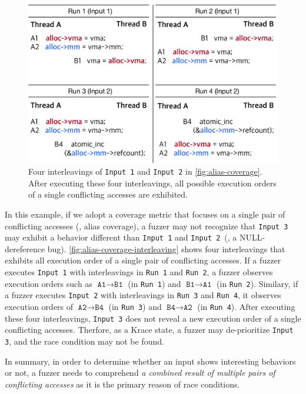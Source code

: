 \begin{figure}[t]
  \centering
  \includegraphics[width=0.9\linewidth]{fig/alias-coverage-interleaving.pdf}
  \caption{Four interleavings of \texttt{Input 1} and \texttt{Input 2}
    in \autoref{fig:alias-coverage}. After executing these four
    interleavings, all possible execution orders of a single
    conflicting accesses are exhibited.}
  \label{fig:alias-coverage-interleaving}
\end{figure}

In this example, if we adopt a coverage metric that focuses on a
single pair of conflicting accesses (\eg, alias coverage), a fuzzer
may not recognize that \texttt{Input 3} may exhibit a behavior
different than \texttt{Input 1} and \texttt{Input 2}~(\ie, a
NULL-dereference bug).
%
\autoref{fig:alias-coverage-interleaving} shows four interleavings
that exhibits all execution order of a single pair of conflicting
accesses. If a fuzzer executes \texttt{Input 1} with interleavings in
\texttt{Run 1} and \texttt{Run 2}, a fuzzer observes execution orders
such as $\texttt{A1} \rightarrow \texttt{B1}$ (in \texttt{Run 1}) and
$\texttt{B1} \rightarrow \texttt{A1}$ (in \texttt{Run 2}).
%
Similary, if a fuzzer executes \texttt{Input 2} with interleavings in
\texttt{Run 3} and \texttt{Run 4}, it observes execution orders of
$\texttt{A2} \rightarrow \texttt{B4}$ (in \texttt{Run 3}) and
$\texttt{B4} \rightarrow \texttt{A2}$ (in \texttt{Run 4}).
%
After executing these four interleavings, \texttt{Input 3} does not
reveal a new execution order of a single conflicting
accesses. Therfore, as a Krace state, a fuzzer may de-prioritize
\texttt{Input 3}, and the race condition may not be found.

In summary, in order to determine whether an input shows interesting
behaviors or not, a fuzzer needs to comprehend \textit{a combined
  result of multiple pairs of conflicting accesses} as it is the
primary reason of race conditions.


